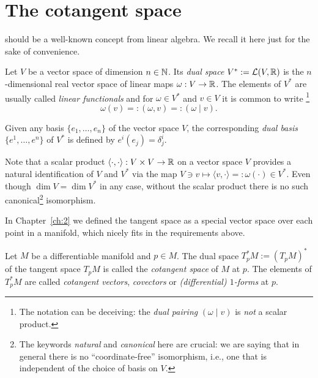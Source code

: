 \section{The cotangent space}

 should be a well-known concept from linear algebra. We recall it here just for the sake of convenience.

\begin{definition}
	Let $V$ be a vector space of dimension $n\in \mathbb{N}$.
	Its \emph{dual space} $V^* := \mathcal{L}(V, \mathbb{R})$ is the $n$-dimensional real vector space of linear maps $\omega:V \to \mathbb{R}$.
	The elements of $V^*$ are usually called \emph{linear functionals} and for $\omega\in V^*$ and $v\in V$ it is common to write
	\footnote{The notation can be deceiving: the \emph{dual pairing} $(\omega \mid v)$ is \emph{not} a scalar product.}
	\begin{equation}
		\omega(v) =: (\omega, v) =: (\omega \mid v).
	\end{equation}

	Given any basis $\{e_1, \ldots, e_n\}$ of the vector space $V$, the corresponding \emph{dual basis} $\{e^1, \ldots, e^n\}$ of $V^*$ is defined by $e^i(e_j) = \delta^i_j$.
\end{definition}

\begin{remark}\label{rmk:identification}
	Note that a scalar product $\langle\cdot, \cdot\rangle :  V\times V \to \mathbb{R}$ on a vector space $V$ provides a natural identification of $V$ and $V^*$ via the map $V\ni v \mapsto \langle v, \cdot \rangle =: \omega(\cdot) \in V^*$.
	Even though $\dim V = \dim V^*$ in any case, without the scalar product there is no such canonical\footnote{The keywords \emph{natural} and \emph{canonical} here are crucial: we are saying that in general there is no ``coordinate-free'' isomorphism, i.e., one that is independent of the choice of basis on $V$.} isomorphism.
\end{remark}

In Chapter~\ref{ch:2} we defined the tangent space as a special vector space over each point in a manifold, which nicely fits in the requirements above.

\begin{definition}
	Let $M$ be a differentiable manifold and $p\in M$.
	The dual space $T_p^*M := (T_pM)^*$ of the tangent space $T_pM$ is called the \emph{cotangent space} of $M$ at $p$.
	The elements of $T^*_pM$ are called \emph{cotangent vectors}, \emph{covectors} or \emph{(differential) $1$-forms} at $p$.
\end{definition}

